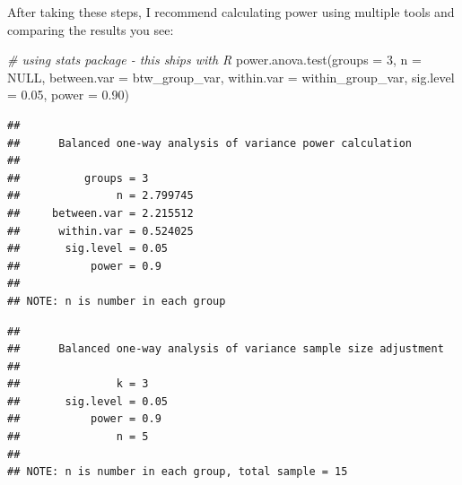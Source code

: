 \documentclass[
]{book}
\newenvironment{Shaded}{\begin{snugshade}}{\end{snugshade}}
\newcommand{\AttributeTok}[1]{\textcolor[rgb]{0.77,0.63,0.00}{#1}}
\newcommand{\CommentTok}[1]{\textcolor[rgb]{0.56,0.35,0.01}{\textit{#1}}}
\newcommand{\ConstantTok}[1]{\textcolor[rgb]{0.00,0.00,0.00}{#1}}
\newcommand{\DecValTok}[1]{\textcolor[rgb]{0.00,0.00,0.81}{#1}}
\newcommand{\FloatTok}[1]{\textcolor[rgb]{0.00,0.00,0.81}{#1}}
\newcommand{\FunctionTok}[1]{\textcolor[rgb]{0.00,0.00,0.00}{#1}}
\newcommand{\NormalTok}[1]{#1}
\newcommand{\SpecialCharTok}[1]{\textcolor[rgb]{0.00,0.00,0.00}{#1}}
\begin{document}
After taking these steps, I recommend calculating power using multiple tools and comparing the results you see:

\begin{Shaded}
\begin{Highlighting}[]
\CommentTok{\# using \textquotesingle{}stats\textquotesingle{} package {-} this ships with R}
\FunctionTok{power.anova.test}\NormalTok{(}\AttributeTok{groups =} \DecValTok{3}\NormalTok{,}
                 \AttributeTok{n =} \ConstantTok{NULL}\NormalTok{,}
                 \AttributeTok{between.var =}\NormalTok{ btw\_group\_var,}
                 \AttributeTok{within.var =}\NormalTok{ within\_group\_var,}
                 \AttributeTok{sig.level =} \FloatTok{0.05}\NormalTok{,}
                 \AttributeTok{power =} \FloatTok{0.90}\NormalTok{)}
\end{Highlighting}
\end{Shaded}

\begin{verbatim}
## 
##      Balanced one-way analysis of variance power calculation 
## 
##          groups = 3
##               n = 2.799745
##     between.var = 2.215512
##      within.var = 0.524025
##       sig.level = 0.05
##           power = 0.9
## 
## NOTE: n is number in each group
\end{verbatim}

\begin{Shaded}
\end{Shaded}

\begin{verbatim}
## 
##      Balanced one-way analysis of variance sample size adjustment 
## 
##               k = 3
##       sig.level = 0.05
##           power = 0.9
##               n = 5
## 
## NOTE: n is number in each group, total sample = 15
\end{verbatim}
\end{document}
